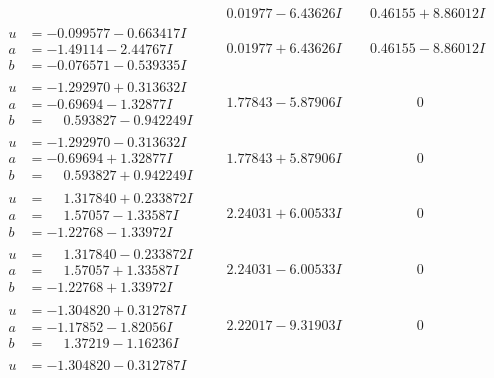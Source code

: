 \documentclass[1p]{elsarticle_modified}
\theoremstyle{definition}
\begin{document}
$$\begin{array}{c|c|c}
 & \phantom{-}0.01977 - 6.43626 I & \phantom{-}0.46155 + 8.86012 I \\ \hline\begin{aligned}
u &= -0.099577 - 0.663417 I \\
a &= -1.49114 - 2.44767 I \\
b &= -0.076571 - 0.539335 I\end{aligned}
 & \phantom{-}0.01977 + 6.43626 I & \phantom{-}0.46155 - 8.86012 I \\ \hline\begin{aligned}
u &= -1.292970 + 0.313632 I \\
a &= -0.69694 - 1.32877 I \\
b &= \phantom{-}0.593827 - 0.942249 I\end{aligned}
 & \phantom{-}1.77843 - 5.87906 I & \phantom{-0.000000 } 0 \\ \hline\begin{aligned}
u &= -1.292970 - 0.313632 I \\
a &= -0.69694 + 1.32877 I \\
b &= \phantom{-}0.593827 + 0.942249 I\end{aligned}
 & \phantom{-}1.77843 + 5.87906 I & \phantom{-0.000000 } 0 \\ \hline\begin{aligned}
u &= \phantom{-}1.317840 + 0.233872 I \\
a &= \phantom{-}1.57057 - 1.33587 I \\
b &= -1.22768 - 1.33972 I\end{aligned}
 & \phantom{-}2.24031 + 6.00533 I & \phantom{-0.000000 } 0 \\ \hline\begin{aligned}
u &= \phantom{-}1.317840 - 0.233872 I \\
a &= \phantom{-}1.57057 + 1.33587 I \\
b &= -1.22768 + 1.33972 I\end{aligned}
 & \phantom{-}2.24031 - 6.00533 I & \phantom{-0.000000 } 0 \\ \hline\begin{aligned}
u &= -1.304820 + 0.312787 I \\
a &= -1.17852 - 1.82056 I \\
b &= \phantom{-}1.37219 - 1.16236 I\end{aligned}
 & \phantom{-}2.22017 - 9.31903 I & \phantom{-0.000000 } 0 \\ \hline\begin{aligned}
u &= -1.304820 - 0.312787 I \\

\end{aligned}
\end{array}$$
\end{document}
